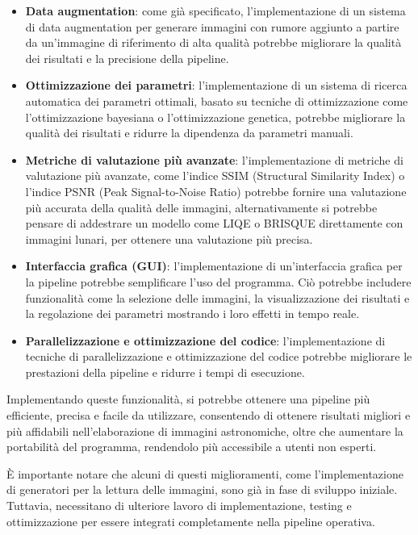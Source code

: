 \begin{itemize}
    \item \textbf{Data augmentation}: come già specificato, l'implementazione di un sistema di data augmentation per generare immagini con rumore aggiunto a partire da un'immagine di riferimento di alta qualità potrebbe migliorare la qualità dei risultati e la precisione della pipeline.
    
    \item \textbf{Ottimizzazione dei parametri}: l'implementazione di un sistema di ricerca automatica dei parametri ottimali, basato su tecniche di ottimizzazione come l'ottimizzazione bayesiana o l'ottimizzazione genetica, potrebbe migliorare la qualità dei risultati e ridurre la dipendenza da parametri manuali.
    
    \item \textbf{Metriche di valutazione più avanzate}: l'implementazione di metriche di valutazione più avanzate, come l'indice SSIM (Structural Similarity Index) o l'indice PSNR (Peak Signal-to-Noise Ratio) potrebbe fornire una valutazione più accurata della qualità delle immagini, alternativamente si potrebbe pensare di addestrare un modello come LIQE o BRISQUE direttamente con immagini lunari, per ottenere una valutazione più precisa.
    
    \item \textbf{Interfaccia grafica (GUI)}: l'implementazione di un'interfaccia grafica per la pipeline potrebbe semplificare l'uso del programma. Ciò potrebbe includere funzionalità come la selezione delle immagini, la visualizzazione dei risultati e la regolazione dei parametri mostrando i loro effetti in tempo reale.
    
    \item \textbf{Parallelizzazione e ottimizzazione del codice}: l'implementazione di tecniche di parallelizzazione e ottimizzazione del codice potrebbe migliorare le prestazioni della pipeline e ridurre i tempi di esecuzione.
\end{itemize}

Implementando queste funzionalità, si potrebbe ottenere una pipeline più efficiente, precisa e facile da utilizzare, consentendo di ottenere risultati migliori e più affidabili nell'elaborazione di immagini astronomiche, oltre che aumentare la portabilità del programma, rendendolo più accessibile a utenti non esperti.

È importante notare che alcuni di questi miglioramenti, come l'implementazione di generatori per la lettura delle immagini, sono già in fase di sviluppo iniziale. Tuttavia, necessitano di ulteriore lavoro di implementazione, testing e ottimizzazione per essere integrati completamente nella pipeline operativa.

\cleardoublepage